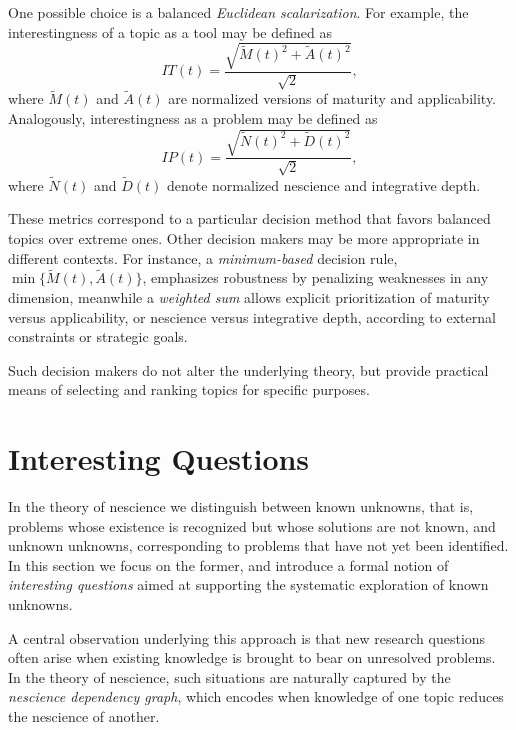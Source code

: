 One possible choice is a balanced \emph{Euclidean scalarization}. For example, the interestingness of a topic as a tool may be defined as
\[
IT(t) = \frac{\sqrt{\tilde{M}(t)^2 + \tilde{A}(t)^2}}{\sqrt{2}},
\]
where $\tilde{M}(t)$ and $\tilde{A}(t)$ are normalized versions of maturity and applicability. Analogously, interestingness as a problem may be defined as
\[
IP(t) = \frac{\sqrt{\tilde{N}(t)^2 + \tilde{D}(t)^2}}{\sqrt{2}},
\]
where $\tilde{N}(t)$ and $\tilde{D}(t)$ denote normalized nescience and integrative depth.

These metrics correspond to a particular decision method that favors balanced topics over extreme ones. Other decision makers may be more appropriate in different contexts. For instance, a \emph{minimum-based} decision rule, $\min\{\tilde{M}(t), \tilde{A}(t)\}$, emphasizes robustness by penalizing weaknesses in any dimension, meanwhile a \emph{weighted sum} allows explicit prioritization of maturity versus applicability, or nescience versus integrative depth, according to external constraints or strategic goals.

Such decision makers do not alter the underlying theory, but provide practical means of selecting and ranking topics for specific purposes.

%
%

\section{Interesting Questions}
\label{sec:intro_interesting_questions}

In the theory of nescience we distinguish between known unknowns, that is, problems whose existence is recognized but whose solutions are not known, and unknown unknowns, corresponding to problems that have not yet been identified. In this section we focus on the former, and introduce a formal notion of \emph{interesting questions} aimed at supporting the systematic exploration of known unknowns.

A central observation underlying this approach is that new research questions often arise when existing knowledge is brought to bear on unresolved problems. In the theory of nescience, such situations are naturally captured by the \emph{nescience dependency graph}, which encodes when knowledge of one topic reduces the nescience of another.

